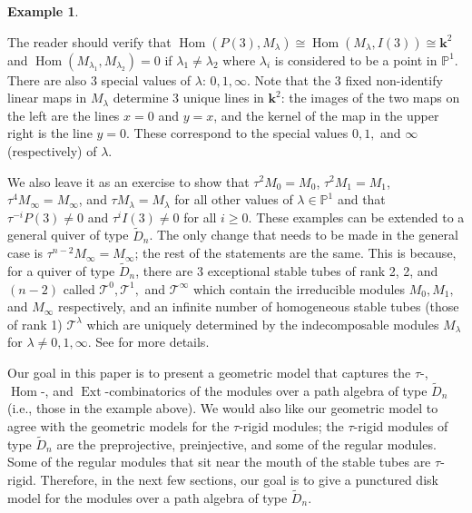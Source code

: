 \documentclass[11pt]{amsart}
\theoremstyle{plain}
\theoremstyle{definition}
\newtheorem{example}[theorem]{Example}
\numberwithin{equation}{section}
\renewcommand{\k}{\mathbf{k}}
\newcommand{\Hom}{\operatorname{Hom}}
\newcommand{\Ext}{\operatorname{Ext}}
\begin{document}
\begin{example}
\begin{center}
    \end{center}
    The reader should verify that $\Hom(P(3), M_\lambda) \cong \Hom(M_\lambda, I(3)) \cong \k^2$ and $\Hom(M_{\lambda_1}, M_{\lambda_2}) = 0$ if $\lambda_1 \neq \lambda_2$ where $\lambda_i$ is considered to be a point in $\mathbb{P}^1$.
    There are also 3 special values of $\lambda$: $0,1,\infty$.
    Note that the 3 fixed non-identify linear maps in $M_\lambda$ determine 3 unique lines in $\k^2$: the images of the two maps on the left are the lines $x=0$ and $y=x$, and the kernel of the map in the upper right is the line $y=0$.
    These correspond to the special values $0,1,$ and $\infty$ (respectively) of $\lambda$.
    
    We also leave it as an exercise to show that $\tau^2 M_0 = M_0$, $\tau^2 M_1 = M_1$, $\tau^4 M_\infty = M_\infty$, and $\tau M_\lambda = M_\lambda$ for all other values of $\lambda \in \mathbb{P}^1$ and that $\tau^{-i} P(3) \neq 0$ and $\tau^i I(3) \neq 0$ for all $i \geq 0$.
    These examples can be extended to a general quiver of type $\widetilde{D}_n$.
    The only change that needs to be made in the general case is $\tau^{n-2} M_\infty = M_\infty$; the rest of the statements are the same.
    This is because, for a quiver of type $\widetilde{D}_n$, there are 3 exceptional stable tubes of rank 2, 2, and $(n-2)$ called $\mathcal{T}^0, \mathcal{T}^1,$ and $\mathcal{T}^\infty$ which contain the irreducible modules $M_0, M_1,$ and $M_\infty$ respectively, and an infinite number of homogeneous stable tubes (those of rank 1) $\mathcal{T}^\lambda$ which are uniquely determined by the indecomposable modules $M_\lambda$ for $\lambda \neq 0,1,\infty$.
    See \cite{simson_elements_2007-1} for more details.
\end{example}

Our goal in this paper is to present a geometric model that captures the $\tau$-, $\Hom$-, and $\Ext$-combinatorics of the modules over a path algebra of type $\widetilde{D}_n$ (i.e., those in the example above).
We would also like our geometric model to agree with the geometric models for the $\tau$-rigid modules; the $\tau$-rigid modules of type $\widetilde{D}_n$ are the preprojective, preinjective, and some of the regular modules.
Some of the regular modules that sit near the mouth of the stable tubes are $\tau$-rigid.
Therefore, in the next few sections, our goal is to give a punctured disk model for the modules over a path algebra of type $\widetilde{D}_n$.
\end{document}
